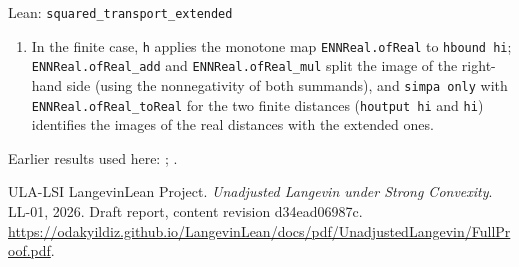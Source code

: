\documentclass[11pt,a4paper]{article}
\begin{document}
\begin{leanbox}{Lean: \texttt{squared\_\allowbreak{}transport\_\allowbreak{}extended}}
\begin{enumerate}
\item In the finite case, \texttt{h} applies the monotone map \texttt{ENNReal.\allowbreak{}of\allowbreak{}Real} to \texttt{hbound hi}; \texttt{ENNReal.\allowbreak{}of\allowbreak{}Real\_\allowbreak{}add} and \texttt{ENNReal.\allowbreak{}of\allowbreak{}Real\_\allowbreak{}mul} split the image of the right-hand side (using the nonnegativity of both summands), and \texttt{simpa only} with \texttt{ENNReal.\allowbreak{}of\allowbreak{}Real\_\allowbreak{}to\allowbreak{}Real} for the two finite distances (\texttt{houtput hi} and \texttt{hi}) identifies the images of the real distances with the extended ones.

\end{enumerate}
\end{leanbox}


Earlier results used here: \cite[Section~3.17.3]{LangevinLean2026ULASC}; \cite[Section~3.17.4]{LangevinLean2026ULASC}.

\begin{thebibliography}{ULA-LSI}
LangevinLean Project. \emph{Unadjusted Langevin under Strong Convexity}. LL-01, 2026. Draft report, content revision d34ead06987c. \url{https://odakyildiz.github.io/LangevinLean/docs/pdf/UnadjustedLangevin/FullProof.pdf}.
\end{thebibliography}
\end{document}
